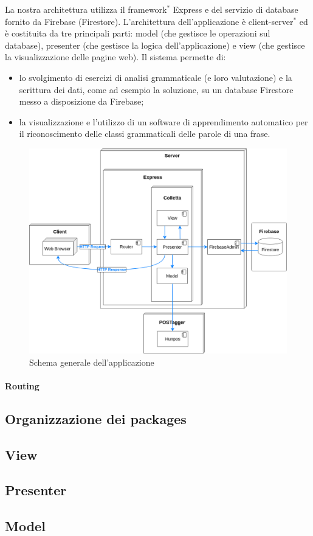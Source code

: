 La nostra architettura utilizza il framework$^{*}$ Express e del servizio di database fornito da Firebase (Firestore). L'architettura dell'applicazione è client-server$^{*}$ ed è costituita da tre principali parti: model (che gestisce le operazioni sul database), presenter (che gestisce la logica dell'applicazione) e view (che gestisce la visualizzazione delle pagine web). Il sistema permette di:
\begin{itemize}
	\item lo svolgimento di esercizi di analisi grammaticale (e loro valutazione) e la scrittura dei dati, come ad esempio la soluzione, su un database Firestore messo a disposizione da Firebase;
	\item la visualizzazione e l'utilizzo di un software di apprendimento automatico per il riconoscimento delle classi grammaticali delle parole di una frase.
\end{itemize}

\begin{figure}[h]
	\includegraphics[scale=0.4]{images/architettura.png}
	\caption{Schema generale dell'applicazione}
\end{figure}

\paragraph*{Routing\\}

\newpage

\subsection{Organizzazione dei packages}

\newpage

\subsection{View}

\newpage
\subsection{Presenter}

\newpage
\subsection{Model}

\newpage